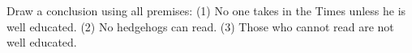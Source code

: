 Draw a conclusion using all premises: (1) No one takes in the Times unless he is well educated. (2) No hedgehogs can read. (3) Those who cannot read are not well educated.
